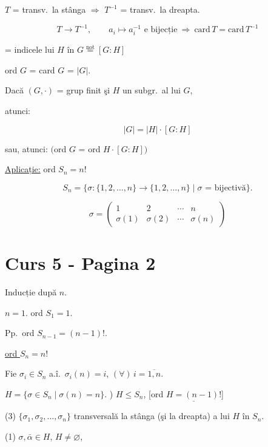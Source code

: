 \noindent $T$ = transv.\ la stânga $\Rightarrow$ $T^{-1}$ = transv.\ la dreapta.

\[
T \xrightarrow{\ } T^{-1}, \qquad a_i \mapsto a_i^{-1} \text{ e bijecție} \ \Rightarrow \ \text{card}\, T = \text{card}\, T^{-1}
\]

\noindent = indicele lui $H$ în $G \overset{\text{not}}{=} [G:H]$

\noindent ord $G$ = card $G$ = $|G|$.

\bigskip
\noindent{} \quad Dacă $(G,\cdot)$ = grup finit şi $H$ un subgr.\ al lui $G$,

\noindent atunci:

\[
\boxed{|G| = |H|\cdot [G:H]}
\]

\noindent sau, atunci: \quad $\big($ord $G$ = ord $H\cdot [G:H]\big)$

\bigskip
\noindent\underline{Aplicație:} ord $S_n = n!$

\[
S_n = \{\sigma : \{1,2,\ldots,n\}\to\{1,2,\ldots,n\} \mid \sigma \text{ = bijectivă}\}.
\]

\[
\sigma = \begin{pmatrix} 1 & 2 & \cdots & n \\ \sigma(1) & \sigma(2) & \cdots & \sigma(n) \end{pmatrix}
\]



\section*{Curs 5 - Pagina 2}

\noindent Inducție după $n$.

\bigskip
\noindent $n=1$. \quad ord $S_1=1$.

\bigskip
\noindent Pp.\ ord $S_{n-1}=(n-1)!$.

\noindent\underline{ord $S_n=n!$}

\bigskip
\noindent Fie $\sigma_i\in S_n$ a.î.\ $\sigma_i(n)=i$, $(\forall)\, i=\overline{1,n}$.

\bigskip
\noindent $H=\{\sigma\in S_n \mid \sigma(n)=n\}$. ) \underline{$H\leq S_n$}, [ord $\underline{H=(n-1)!}$]

\bigskip
\noindent (3) $\{\sigma_1,\sigma_2,\ldots,\sigma_n\}$ transversală la stânga (şi la dreapta) a lui $H$ în $S_n$.

\bigskip
\noindent (1) $\sigma,\bar\alpha\in H$, $H\neq\varnothing$,

